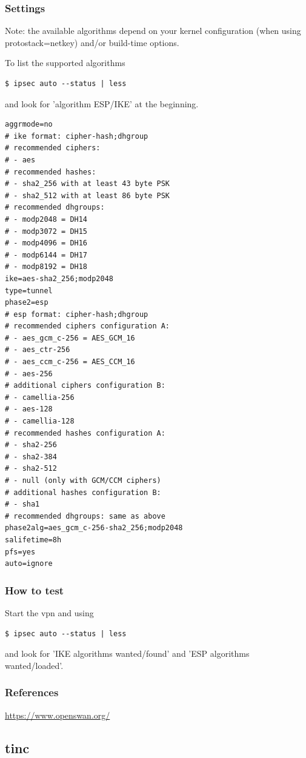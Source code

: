 \subsubsection{Settings}
Note: the available algorithms depend on your kernel configuration (when using protostack=netkey) and/or build-time options.

To list the supported algorithms
\begin{lstlisting}
$ ipsec auto --status | less
\end{lstlisting}
and look for 'algorithm ESP/IKE' at the beginning.

\begin{lstlisting}
aggrmode=no
# ike format: cipher-hash;dhgroup
# recommended ciphers:
# - aes
# recommended hashes:
# - sha2_256 with at least 43 byte PSK
# - sha2_512 with at least 86 byte PSK
# recommended dhgroups:
# - modp2048 = DH14
# - modp3072 = DH15
# - modp4096 = DH16
# - modp6144 = DH17
# - modp8192 = DH18
ike=aes-sha2_256;modp2048
type=tunnel
phase2=esp
# esp format: cipher-hash;dhgroup
# recommended ciphers configuration A:
# - aes_gcm_c-256 = AES_GCM_16
# - aes_ctr-256
# - aes_ccm_c-256 = AES_CCM_16
# - aes-256 
# additional ciphers configuration B:
# - camellia-256
# - aes-128
# - camellia-128
# recommended hashes configuration A:
# - sha2-256
# - sha2-384
# - sha2-512
# - null (only with GCM/CCM ciphers)
# additional hashes configuration B:
# - sha1
# recommended dhgroups: same as above
phase2alg=aes_gcm_c-256-sha2_256;modp2048
salifetime=8h
pfs=yes
auto=ignore
\end{lstlisting}

\subsubsection{How to test}
Start the vpn and using
\begin{lstlisting}
$ ipsec auto --status | less
\end{lstlisting}
and look for 'IKE algorithms wanted/found' and 'ESP algorithms wanted/loaded'.

\subsubsection{References}
\begin{itemize*}
  \item \url{https://www.openswan.org/}
\end{itemize*}


\subsection{tinc}
